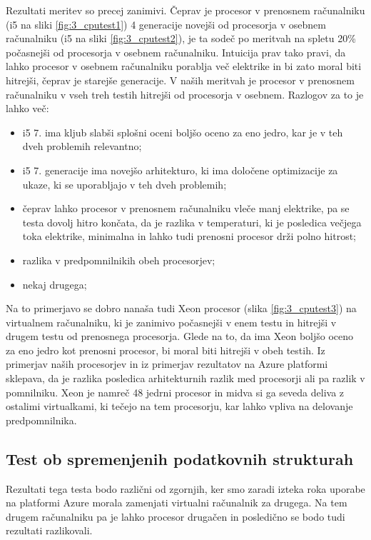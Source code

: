 Rezultati meritev so precej zanimivi. Čeprav je procesor v prenosnem računalniku (i5 na sliki \ref{fig:3_cputest1}) 4 generacije novejši od procesorja v osebnem računalniku (i5 na sliki \ref{fig:3_cputest2}), je ta sodeč po meritvah na spletu 20\% počasnejši od procesorja v osebnem računalniku. Intuicija prav tako pravi, da lahko procesor v osebnem računalniku porablja več elektrike in bi zato moral biti hitrejši, čeprav je starejše generacije. V naših meritvah je procesor v prenosnem računalniku v vseh treh testih hitrejši od procesorja v osebnem. Razlogov za to je lahko več:

\begin{itemize}
	\item i5 7. ima kljub slabši splošni oceni boljšo oceno za eno jedro, kar je v teh dveh problemih relevantno;
	\item i5 7. generacije ima novejšo arhitekturo, ki ima določene optimizacije za ukaze, ki se uporabljajo v teh dveh problemih;
	\item čeprav lahko procesor v prenosnem računalniku vleče manj elektrike, pa se testa dovolj hitro končata, da je razlika v temperaturi, ki je posledica večjega toka elektrike, minimalna in lahko tudi prenosni procesor drži polno hitrost;
	\item razlika v predpomnilnikih obeh procesorjev;
	\item nekaj drugega;
\end{itemize}

Na to primerjavo se dobro nanaša tudi Xeon procesor (slika \ref{fig:3_cputest3}) na virtualnem računalniku, ki je zanimivo počasnejši v enem testu in hitrejši v drugem testu od prenosnega procesorja. Glede na to, da ima Xeon boljšo oceno za eno jedro kot prenosni procesor, bi moral biti hitrejši v obeh testih. Iz primerjav naših procesorjev in iz primerjav rezultatov na Azure platformi sklepava, da je razlika posledica arhitekturnih razlik med procesorji ali pa razlik v pomnilniku. Xeon je namreč 48 jedrni procesor in midva si ga seveda deliva z ostalimi virtualkami, ki tečejo na tem procesorju, kar lahko vpliva na delovanje predpomnilnika.

\subsection{Test ob spremenjenih podatkovnih strukturah}

Rezultati tega testa bodo različni od zgornjih, ker smo zaradi izteka roka uporabe na platformi Azure morala zamenjati virtualni računalnik za drugega. Na tem drugem računalniku pa je lahko procesor drugačen in posledično se bodo tudi rezultati razlikovali.

